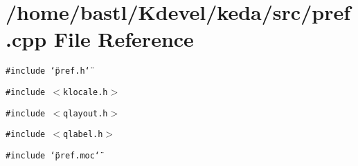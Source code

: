 \section{/home/bastl/Kdevel/keda/src/pref.cpp File Reference}
\label{src_2pref_8cpp}
{\tt \#include \char`\"{}pref.h\char`\"{}}\par
{\tt \#include $<$klocale.h$>$}\par
{\tt \#include $<$qlayout.h$>$}\par
{\tt \#include $<$qlabel.h$>$}\par
{\tt \#include \char`\"{}pref.moc\char`\"{}}\par
